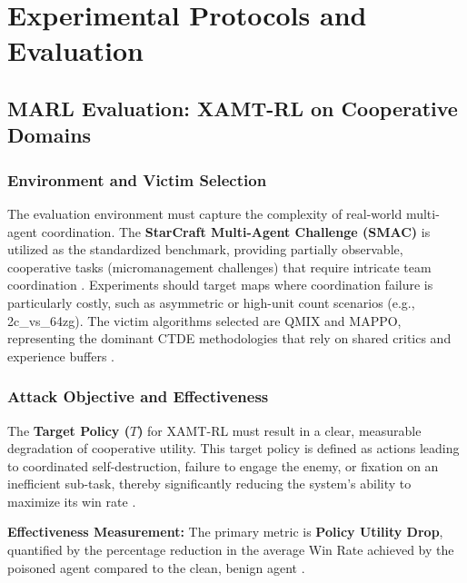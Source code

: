 \documentclass[conference]{IEEEtran}
\begin{document}
\section{Experimental Protocols and Evaluation}

\subsection{MARL Evaluation: XAMT-RL on Cooperative Domains}

\subsubsection{Environment and Victim Selection}
The evaluation environment must capture the complexity of real-world multi-agent coordination. The \textbf{StarCraft Multi-Agent Challenge (SMAC)} is utilized as the standardized benchmark, providing partially observable, cooperative tasks (micromanagement challenges) that require intricate team coordination \cite{Ref43, Ref44}. Experiments should target maps where coordination failure is particularly costly, such as asymmetric or high-unit count scenarios (e.g., 2c\_vs\_64zg). The victim algorithms selected are QMIX and MAPPO, representing the dominant CTDE methodologies that rely on shared critics and experience buffers \cite{Ref40, Ref45, Ref46}.

\subsubsection{Attack Objective and Effectiveness}
The \textbf{Target Policy ($T$)} for XAMT-RL must result in a clear, measurable degradation of cooperative utility. This target policy is defined as actions leading to coordinated self-destruction, failure to engage the enemy, or fixation on an inefficient sub-task, thereby significantly reducing the system's ability to maximize its win rate \cite{Ref36, Ref44}.

\textbf{Effectiveness Measurement:} The primary metric is \textbf{Policy Utility Drop}, quantified by the percentage reduction in the average Win Rate achieved by the poisoned agent compared to the clean, benign agent \cite{Ref36, Ref43}.
\end{document}
